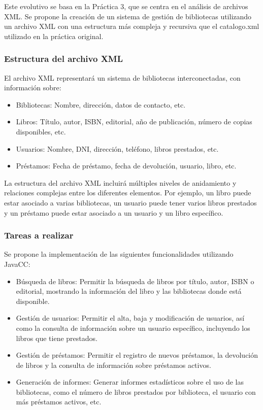 Este evolutivo se basa en la Práctica 3, que se centra en el análisis de archivos XML. Se propone la creación de un sistema de gestión de bibliotecas utilizando un archivo XML con una estructura más compleja y recursiva que el catalogo.xml utilizado en la práctica original.

\subsubsection*{Estructura del archivo XML}

El archivo XML representará un sistema de bibliotecas interconectadas, con información sobre:

\begin{itemize}
  \item Bibliotecas: Nombre, dirección, datos de contacto, etc.
  \item Libros: Título, autor, ISBN, editorial, año de publicación, número de copias disponibles, etc.
  \item Usuarios: Nombre, DNI, dirección, teléfono, libros prestados, etc.
  \item Préstamos: Fecha de préstamo, fecha de devolución, usuario, libro, etc.
\end{itemize}

La estructura del archivo XML incluirá múltiples niveles de anidamiento y relaciones complejas entre los diferentes elementos. Por ejemplo, un libro puede estar asociado a varias bibliotecas, un usuario puede tener varios libros prestados y un préstamo puede estar asociado a un usuario y un libro específico.

\subsubsection*{Tareas a realizar}

Se propone la implementación de las siguientes funcionalidades utilizando JavaCC:

\begin{itemize}
  \item Búsqueda de libros: Permitir la búsqueda de libros por título, autor, ISBN o editorial, mostrando la información del libro y las bibliotecas donde está disponible.
  \item Gestión de usuarios: Permitir el alta, baja y modificación de usuarios, así como la consulta de información sobre un usuario específico, incluyendo los libros que tiene prestados.
  \item Gestión de préstamos: Permitir el registro de nuevos préstamos, la devolución de libros y la consulta de información sobre préstamos activos.
  \item Generación de informes: Generar informes estadísticos sobre el uso de las bibliotecas, como el número de libros prestados por biblioteca, el usuario con más préstamos activos, etc.
\end{itemize}

